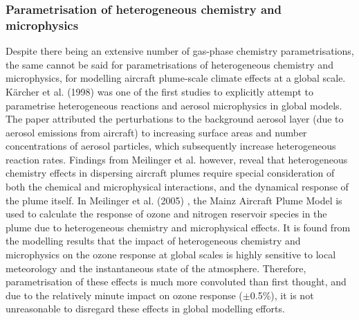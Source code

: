 \subsubsection{Parametrisation of heterogeneous chemistry and microphysics}
Despite there being an extensive number of gas-phase chemistry parametrisations, the same cannot be said for parametrisations of heterogeneous chemistry and microphysics, for modelling aircraft plume-scale climate effects at a global scale. K{\"a}rcher et al. (1998) \cite{Karcher1998} was one of the first studies to explicitly attempt to parametrise heterogeneous reactions and aerosol microphysics in global models. The paper attributed the perturbations to the background aerosol layer (due to aerosol emissions from aircraft) to increasing surface areas and number concentrations of aerosol particles, which subsequently increase heterogeneous reaction rates. Findings from Meilinger et al. \cite{Meilinger2002, Meilinger2005} however, reveal that heterogeneous chemistry effects in dispersing aircraft plumes require special consideration of both the chemical and microphysical interactions, and the dynamical response of the plume itself. In Meilinger et al. (2005) \cite{Meilinger2005}, the Mainz Aircraft Plume Model is used to calculate the response of ozone and nitrogen reservoir species in the plume due to heterogeneous chemistry and microphysical effects. It is found from the modelling results that the impact of heterogeneous chemistry and microphysics on the ozone response at global scales is highly sensitive to local meteorology and the instantaneous state of the atmosphere. Therefore, parametrisation of these effects is much more convoluted than first thought, and due to the relatively minute impact on ozone response ($\pm$0.5\%), it is not unreasonable to disregard these effects in global modelling efforts.

